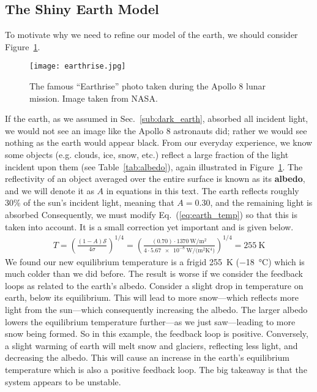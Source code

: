 
    \subsection{The Shiny Earth Model} %
    \label{sub:shiny_earth}
   
    To motivate why we need to refine our model of the earth, we should consider Figure~\ref{fig:earthrise}.

    \begin{figure}[hb!]
        \centering
        \texttt{[image: earthrise.jpg]}
        \caption{The famous ``Earthrise'' photo taken during the Apollo 8 lunar mission. Image taken from NASA.}
        \label{fig:earthrise}
    \end{figure}

    If the earth, as we assumed in Sec.~\ref{sub:dark_earth}, absorbed all incident light, we would not see an image like the Apollo 8 astronauts did; rather we would see nothing as the earth would appear black.  From our everyday experience, we know some objects (e.g. clouds, ice, snow, etc.) reflect a large fraction of the light incident upon them (see Table~\ref{tab:albedo}), again illustrated in Figure~\ref{fig:earthrise}. The reflectivity of an object averaged over the entire surface is known as its \textbf{albedo}, and we will denote it as $A$ in equations in this text. The earth reflects roughly 30\% of the sun's incident light, meaning that $A = 0.30$, and the remaining light is absorbed \citep{schroeder1999introduction,thorndike1976energy} Consequently, we must modify Eq.~(\ref{eq:earth_temp}) so that this is taken into account. It is a small correction yet important and is given below.
    \begin{align}
        T = \left( \frac{(1-A) \mathcal{S}}{4 \sigma} \right)^{1/4} = \left( \frac{(0.70) \cdot \SI{1370}{\watt/\meter^2}}{4 \cdot \SI{5.67e-8}{\watt/(\meter^2 \kelvin^4)} } \right)^{1/4} = \SI{255}{\kelvin}
        \label{eq:shiny_earth_temp}
    \end{align}
    We found our new equilibrium temperature is a frigid \SI{255}{\kelvin} (\SI{-18}{\celsius}) which is much colder than we did before. The result is worse if we consider the feedback loops as related to the earth's albedo. Consider a slight drop in temperature on earth, below its equilibrium. This will lead to more snow---which reflects more light from the sun---which consequently increasing the albedo. The larger albedo lowers the equilibrium temperature further---as we just saw---leading to more snow being formed. So in this example, the feedback loop is positive. Conversely, a slight warming of earth  will melt snow and glaciers, reflecting less light, and decreasing the albedo. This will cause an increase in the earth's equilibrium temperature which is also a positive feedback loop. The big takeaway is that the system appears to be unstable.

